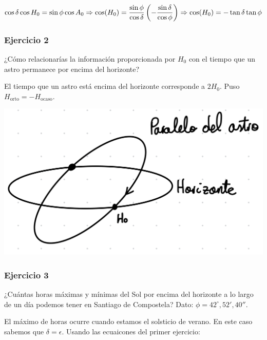 \begin{equation}
	\cos \delta \cos H_0 = \sin \phi \cos A_0 \Rightarrow \cos (H_0) = \frac{\sin \phi}{\cos \delta} \left(  - \frac{\sin \delta}{\cos \phi} \right) \Rightarrow \cos (H_0) = - \tan \delta \tan \phi
\end{equation}


\begin{Enunciado}
	\subsubsection{Ejercicio 2}
	¿Cómo relacionarías la información proporcionada por $H_0$ con el tiempo que un astro permanece por encima del horizonte?
\end{Enunciado}

\begin{minipage}{.45\textwidth}
	El tiempo que un astro está encima del horizonte corresponde a $2H_0$. Puso $H_{\text{orto}}=-H_{\text{ocaso}}$.
\end{minipage}	\hfill
\begin{minipage}{0.45\textwidth}
	\includegraphics[width=1.0\textwidth]{Cuerpo/Imagenes/01_Ejercicio_2.jpg}
\end{minipage}


\begin{Enunciado}
	\subsubsection{Ejercicio 3}
	¿Cuántas horas máximas y mínimas del Sol por encima del horizonte a lo largo de un día podemos tener en Santiago de Compostela? Dato: $\phi=42^\circ,52',40''$.
\end{Enunciado}

El máximo de horas ocurre cuando estamos el solsticio de verano. En este caso sabemos que $\delta=\epsilon$. Usando las ecuaicones del primer ejercicio:

